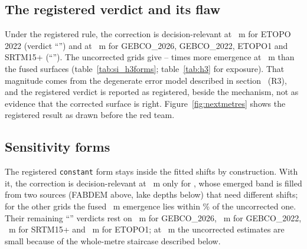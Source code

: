 
\subsection*{The registered verdict and its flaw}
Under the registered rule, the correction is decision-relevant at ~m for ETOPO 2022 (verdict ``'') and at ~m for GEBCO\_2026, GEBCO\_2022, ETOPO1 and SRTM15+ (``''). The uncorrected grids give -- times more emergence at ~m than the fused surfaces (table~\ref{tab:si_h3forms}; table~\ref{tab:h3} for exposure). That magnitude comes from the degenerate error model described in section~\SIredteam{} (R3), and the registered verdict is reported as registered, beside the mechanism, not as evidence that the corrected surface is right. Figure~\ref{fig:nextmetres} shows the registered result as drawn before the red team.

\subsection*{Sensitivity forms}
The registered \texttt{constant} form stays inside the fitted shifts by construction. With it, the correction is decision-relevant at ~m only for , whose emerged band is filled from two sources (FABDEM above, lake depths below) that need different shifts; for the other  grids the fused ~m emergence lies within \% of the uncorrected one. Their remaining ``'' verdicts rest on ~m for GEBCO\_2026, ~m for GEBCO\_2022, ~m for SRTM15+ and ~m for ETOPO1; at ~m the uncorrected estimates are small because of the whole-metre staircase described below.

